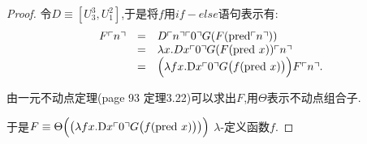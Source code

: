 
\begin{proof}令$D\equiv[U_3^3,U_1^2]$,于是将$f$用$if-else$语句表示有:
\[
  \begin{array}{rcl}
  F\churchnumber{n} & = & D\churchnumber{n}\churchnumber{0} G(F(\mathrm{pred} \churchnumber{n})) \\
  & = & \lambda x. Dx\churchnumber{0} G(F(\mathrm{pred}\ x))  \churchnumber{n} \\
  & = & \Big(\lambda fx.\mathrm{D}x\churchnumber{0}G \big(f(\mathrm{pred}\ x) \big)\Big) F \churchnumber{n}. \\
  \end{array}
\]

由一元不动点定理(page 93 定理3.22)可以求出$F$,用$\Theta$表示不动点组合子.

于是$F\equiv \Theta \Big( \big(\lambda fx.\mathrm{D}x\ulcorner{0}\urcorner G \big(f(\mathrm{pred}\ x) \big)\big) \Big)$ $\lambda$-定义函数$f$.

\end{proof}